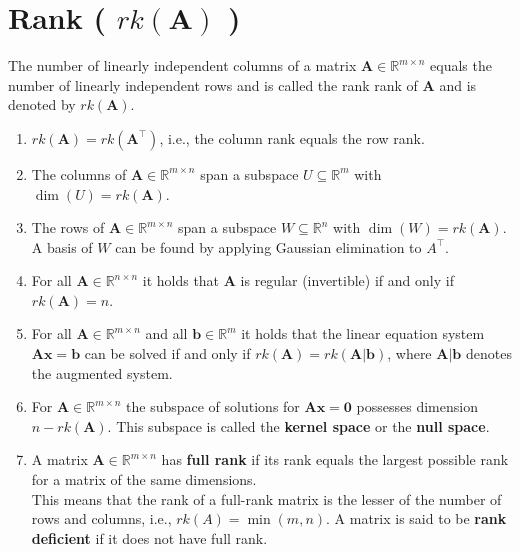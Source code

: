 \section{Rank ( $rk(\mathbf{A})$ ) \cite{mfml-1}}\label{matrix: Rank}

The number of linearly independent columns of a matrix $\mathbf{A} \in \mathbb{R}^{m \times n}$ equals the number of linearly independent rows and is called the rank rank of $\mathbf{A}$ and is denoted by $rk(\mathbf{A})$.

\begin{enumerate}
    \item $rk(\mathbf{A}) = rk(\mathbf{A}^\top)$, i.e., the column rank equals the row rank.

    \item The columns of $\mathbf{A} \in \mathbb{R}^{m \times n}$ span a subspace $U \subseteq \mathbb{R}^m$ with $\dim(U) = rk(\mathbf{A})$. 

    \item The rows of $\mathbf{A} \in \mathbb{R}^{m\times n}$ span a subspace $W \subseteq \mathbb{R}^n$ with $\dim(W) = rk(\mathbf{A})$. A basis of $W$ can be found by applying Gaussian elimination to $A^\top$.

    \item For all $\mathbf{A} \in \mathbb{R}^{n\times n}$ it holds that $\mathbf{A}$ is regular (invertible) if and only if $rk(\mathbf{A}) = n$.

    \item For all $\mathbf{A} \in \mathbb{R}^{m\times n}$ and all $\mathbf{b} \in \mathbb{R}^m$ it holds that the linear equation system $\mathbf{Ax = b}$ can be solved if and only if $rk(\mathbf{A}) = rk(\mathbf{A}|\mathbf{b})$, where $\mathbf{A}|\mathbf{b}$ denotes the augmented system.

    \item For $\mathbf{A} \in \mathbb{R}^{m\times n}$ the subspace of solutions for $\mathbf{Ax = 0}$ possesses dimension $n - rk(\mathbf{A})$. This subspace is called the \textbf{kernel space} or the \textbf{null space}.

    \item A matrix $\mathbf{A} \in \mathbb{R}^{m\times n}$ has \textbf{full rank} if its rank equals the largest possible rank for a matrix of the same dimensions.\\
    This means that the rank of a full-rank matrix is the lesser of the number of rows and columns, i.e., $rk(A) = \min(m, n)$. A matrix is said to be \textbf{rank deficient} if it does not have full rank.

\end{enumerate}


